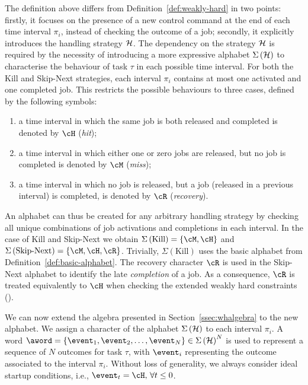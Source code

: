 The definition above differs from Definition~\ref{def:weakly-hard} in two points: firstly, it focuses on the presence of a new control command at the end of each time interval $\pi_i$, instead of checking the outcome of a job; secondly, it explicitly introduces the handling strategy $\mathcal{H}$.
%
The dependency on the strategy $\mathcal{H}$ is required by the necessity of introducing a more expressive alphabet $\Sigma\left(\mathcal{H}\right)$ to characterise the behaviour of task $\tau$ in each possible time interval.
For both the Kill and Skip-Next strategies, each interval $\pi_i$ contains at most one activated and one completed job.
This restricts the possible behaviours to three cases, defined by the following symbols:
\begin{enumerate}[label=(\roman*)]
    \item a time interval in which the same job is both released and completed is denoted by $\cH$ (\emph{hit});
    \item a time interval in which either one or zero jobs are released, but no job is completed is denoted by $\cM$ (\emph{miss});
    \item a time interval in which no job is released, but a job (released in a previous interval) is completed, is denoted by $\cR$ (\emph{recovery}).
\end{enumerate}
An alphabet can thus be created for any arbitrary handling strategy by checking all unique combinations of job activations and completions in each interval. 
In the case of Kill and Skip-Next we obtain $\Sigma\left(\text{Kill}\right) = \{ \cM, \cH \}$ and $\Sigma\left(\text{Skip-Next}\right) = \{ \cM, \cH, \cR \}$.
Trivially, $\Sigma\left(\text{Kill}\right)$ uses the basic alphabet from Definition~\ref{def:basic-alphabet}.
The recovery character $\cR$ is used in the Skip-Next alphabet to identify the late \emph{completion} of a job.
As a consequence, $\cR$ is treated equivalently to $\cH$ when checking the extended weakly hard constraints (\ewhc{}).

We can now extend the algebra presented in Section~\ref{ssec:whalgebra} to the new alphabet.
We assign a character of the alphabet $\Sigma\left(\mathcal{H}\right)$ to each interval $\pi_i$.
A word $\aword = \{\event_1,\event_2,\dots,\event_N \} \in \Sigma\left(\strat\right)^N$ is used to represent a sequence of $N$ outcomes for task $\tau$, with $\event_i$ representing the outcome associated to the interval $\pi_i$. 
Without loss of generality, we always consider ideal startup conditions, i.e., $\event_t=\cH, \, \forall t \leq 0$.

